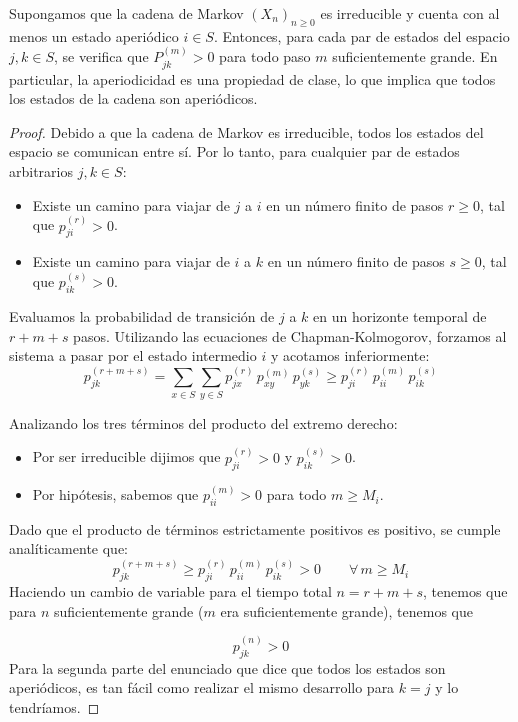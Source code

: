 \documentclass[10pt]{book}
\begin{document}
\begin{lema}
    Supongamos que la cadena de Markov $(X_n)_{n \geq 0}$ es irreducible y cuenta con al menos un estado aperiódico $i \in S$. Entonces, para cada par de estados del espacio $j, k \in S$, se verifica que $P_{jk}^{(m)} > 0$ para todo paso $m$ suficientemente grande. En particular, la aperiodicidad es una propiedad de clase, lo que implica que todos los estados de la cadena son aperiódicos.
\begin{proof}
    Debido a que la cadena de Markov es irreducible, todos los estados del espacio se comunican entre sí. Por lo tanto, para cualquier par de estados arbitrarios $j, k \in S$:
    \begin{itemize}
        \item Existe un camino para viajar de $j$ a $i$ en un número finito de pasos $r \ge 0$, tal que $p_{ji}^{(r)} > 0$.
        \item Existe un camino para viajar de $i$ a $k$ en un número finito de pasos $s \ge 0$, tal que $p_{ik}^{(s)} > 0$.
    \end{itemize}
    Evaluamos la probabilidad de transición de $j$ a $k$ en un horizonte temporal de $r + m + s$ pasos. Utilizando las ecuaciones de Chapman-Kolmogorov, forzamos al sistema a pasar por el estado intermedio $i$ y acotamos inferiormente:
    \[
    p_{jk}^{(r+m+s)} = \sum_{x \in S} \sum_{y \in S} p_{jx}^{(r)} \, p_{xy}^{(m)} \, p_{yk}^{(s)} \ge p_{ji}^{(r)} \, p_{ii}^{(m)} \, p_{ik}^{(s)}
    \]

    Analizando los tres términos del producto del extremo derecho:
    \begin{itemize}
        \item Por ser irreducible dijimos que $p_{ji}^{(r)} > 0$ y $p_{ik}^{(s)} > 0$.
        \item Por hipótesis, sabemos que $p_{ii}^{(m)} > 0$ para todo $m \ge M_i$.
    \end{itemize}
    Dado que el producto de términos estrictamente positivos es positivo, se cumple analíticamente que:
    \[
    p_{jk}^{(r+m+s)} \ge p_{ji}^{(r)} \, p_{ii}^{(m)} \, p_{ik}^{(s)} > 0 \qquad \forall \, m \ge M_i
    \]
    Haciendo un cambio de variable para el tiempo total $n = r + m + s$, tenemos que para $n$ suficientemente grande ($m$ era suficientemente grande), tenemos que

    \begin{equation*}
        p_{jk}^{(n)} > 0 
    \end{equation*}
    Para la segunda parte del enunciado que dice que todos los estados son aperiódicos, es tan fácil como realizar el mismo desarrollo para $k=j$ y lo tendríamos.
\end{proof}
\end{lema}
\end{document}

